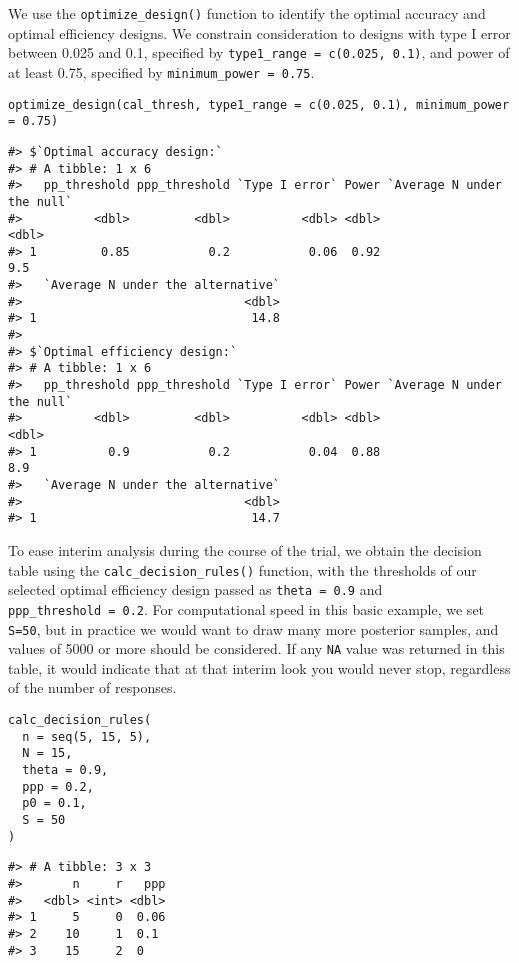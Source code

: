 We use the \texttt{optimize\_design()} function to identify the optimal accuracy and optimal efficiency designs. We constrain consideration to designs with type I error between 0.025 and 0.1, specified by \texttt{type1\_range\ =\ c(0.025,\ 0.1)}, and power of at least 0.75, specified by \texttt{minimum\_power\ =\ 0.75}.

\begin{verbatim}
optimize_design(cal_thresh, type1_range = c(0.025, 0.1), minimum_power = 0.75)
\end{verbatim}

\begin{verbatim}
#> $`Optimal accuracy design:`
#> # A tibble: 1 x 6
#>   pp_threshold ppp_threshold `Type I error` Power `Average N under the null`
#>          <dbl>         <dbl>          <dbl> <dbl>                      <dbl>
#> 1         0.85           0.2           0.06  0.92                        9.5
#>   `Average N under the alternative`
#>                               <dbl>
#> 1                              14.8
#> 
#> $`Optimal efficiency design:`
#> # A tibble: 1 x 6
#>   pp_threshold ppp_threshold `Type I error` Power `Average N under the null`
#>          <dbl>         <dbl>          <dbl> <dbl>                      <dbl>
#> 1          0.9           0.2           0.04  0.88                        8.9
#>   `Average N under the alternative`
#>                               <dbl>
#> 1                              14.7
\end{verbatim}

To ease interim analysis during the course of the trial, we obtain the decision table using the \texttt{calc\_decision\_rules()} function, with the thresholds of our selected optimal efficiency design passed as \texttt{theta\ =\ 0.9} and \texttt{ppp\_threshold\ =\ 0.2}. For computational speed in this basic example, we set \texttt{S=50}, but in practice we would want to draw many more posterior samples, and values of 5000 or more should be considered. If any \texttt{NA} value was returned in this table, it would indicate that at that interim look you would never stop, regardless of the number of responses.

\begin{verbatim}
calc_decision_rules(
  n = seq(5, 15, 5), 
  N = 15,
  theta = 0.9,
  ppp = 0.2,
  p0 = 0.1,
  S = 50
)
\end{verbatim}

\begin{verbatim}
#> # A tibble: 3 x 3
#>       n     r   ppp
#>   <dbl> <int> <dbl>
#> 1     5     0  0.06
#> 2    10     1  0.1 
#> 3    15     2  0
\end{verbatim}

